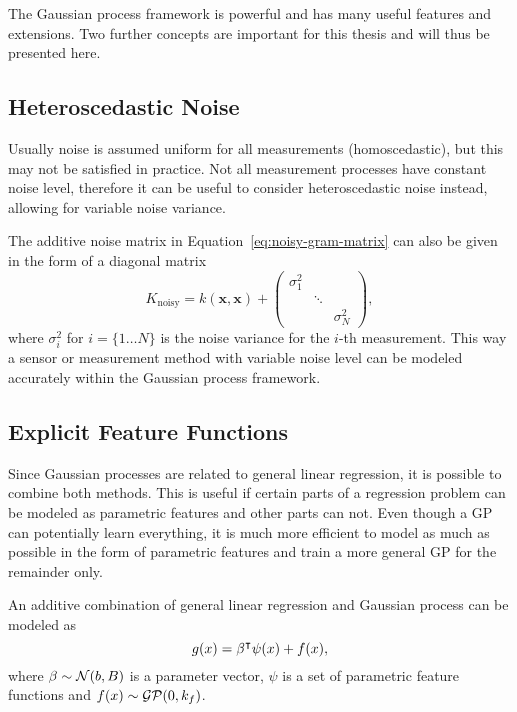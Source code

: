 The Gaussian process framework is powerful and has many useful features
and extensions. Two further concepts are important for this thesis and will
thus be presented here.

\subsection{Heteroscedastic Noise}
\label{sec:heteroscedastic-noise}

Usually noise is assumed uniform for all measurements (homoscedastic), but this
may not be satisfied in practice. Not all measurement processes have constant
noise level, therefore it can be useful to consider heteroscedastic noise
instead, allowing for variable noise variance.

The additive noise matrix in Equation~\eqref{eq:noisy-gram-matrix} can also be
given in the form of a diagonal matrix
\begin{equation}
  K_\text{noisy} = k(\mathbf{x},\mathbf{x}) +
  \begin{pmatrix}\sigma^2_1 &&\\&\ddots&\\&&\sigma^2_N\end{pmatrix},
\end{equation}
where $\sigma^2_i$ for $i=\{1\dots N\}$ is the noise variance for the $i$-th
measurement. This way a sensor or measurement method with variable noise level
can be modeled accurately within the Gaussian process framework.

\subsection{Explicit Feature Functions}
\label{sec:explicit-feature-functions}

Since Gaussian processes are related to general linear regression, it is
possible to combine both methods. This is useful if certain parts of a
regression problem can be modeled as parametric features and other parts can
not. Even though a GP can potentially learn everything, it is much more
efficient to model as much as possible in the form of parametric features and
train a more general GP for the remainder only.

An additive combination of general linear regression and Gaussian process can be
modeled as
\begin{equation}
  g(x) = \beta^{\intercal} \psi(x) + f(x),
\end{equation}
where $\beta\sim\mathcal{N}(b,B)$ is a parameter vector, $\psi$ is a set of parametric
feature functions and $f(x)\sim \mathcal{GP}(0,k_f)$.

